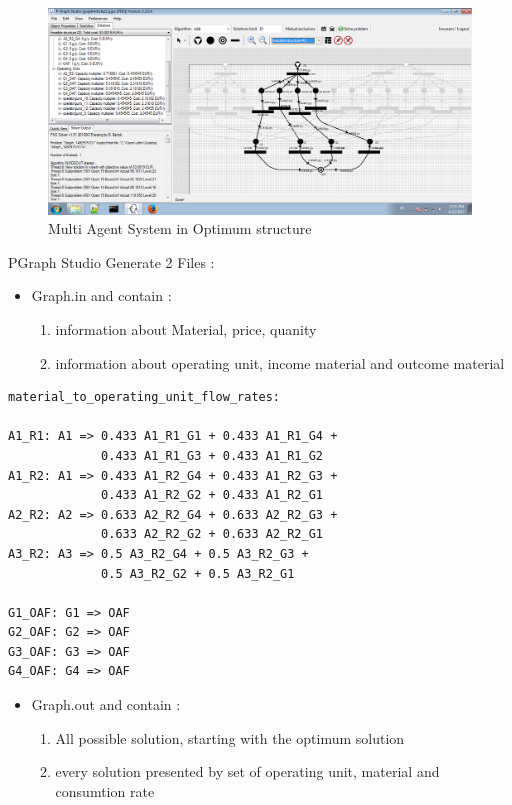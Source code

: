 \begin{figure}[th]
	\centering
		\includegraphics[scale=0.44]{ch3/img/pgraphSol}
	\caption{\label{fig:Multi Agent System in Optimum structure}Multi Agent System in Optimum structure}
\end{figure} 

PGraph Studio Generate 2 Files : 
\begin{itemize}
	\item Graph.in and contain :
		\begin{enumerate}
			\item information about Material, price, quanity
			\item information about operating unit, income material and outcome material 
 	\end{enumerate}

\end{itemize}

\begin{lstlisting}[caption=Part from Graph.in]
material_to_operating_unit_flow_rates:

A1_R1: A1 => 0.433 A1_R1_G1 + 0.433 A1_R1_G4 +
			 0.433 A1_R1_G3 + 0.433 A1_R1_G2
A1_R2: A1 => 0.433 A1_R2_G4 + 0.433 A1_R2_G3 + 
			 0.433 A1_R2_G2 + 0.433 A1_R2_G1
A2_R2: A2 => 0.633 A2_R2_G4 + 0.633 A2_R2_G3 + 
			 0.633 A2_R2_G2 + 0.633 A2_R2_G1
A3_R2: A3 => 0.5 A3_R2_G4 + 0.5 A3_R2_G3 + 
			 0.5 A3_R2_G2 + 0.5 A3_R2_G1
			 
G1_OAF: G1 => OAF
G2_OAF: G2 => OAF
G3_OAF: G3 => OAF
G4_OAF: G4 => OAF

\end{lstlisting}



\begin{itemize}
	\item Graph.out and contain :
		\begin{enumerate}
			\item All possible solution, starting with the optimum solution 
			\item every solution presented by set of  operating unit, material and consumtion rate  
 	\end{enumerate}

\end{itemize}



